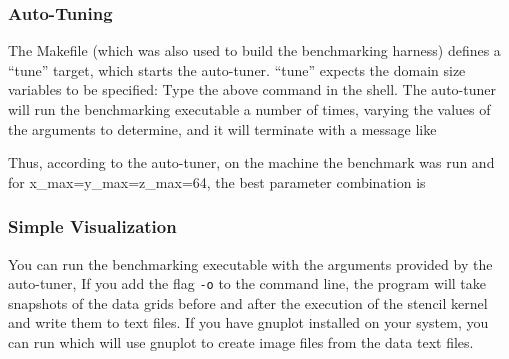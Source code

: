 \subsubsection{Auto-Tuning}

The Makefile (which was also used to build the benchmarking harness) defines a ``tune'' target, which
starts the auto-tuner. ``tune'' expects the domain size variables to be specified:
Type the above command in the shell. The auto-tuner will run the benchmarking executable a number of times,
varying the values of the arguments to determine, and it will terminate with a message like


\noindent Thus, according to the auto-tuner, on the machine the benchmark was run and for x\_max=y\_max=z\_max=64,
the best parameter combination is 


\subsubsection{Simple Visualization}

You can run the benchmarking executable with the arguments provided by the auto-tuner,
If you add the flag \texttt{-o} to the command line,
the program will take snapshots of the data grids before and after the execution of the stencil kernel
and write them to text files. If you have gnuplot installed on your system, you can run
 which will use gnuplot to create image files from the data text files.


